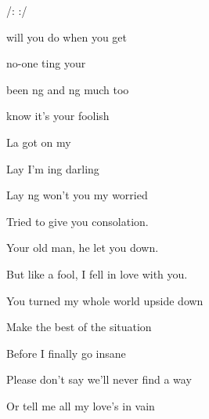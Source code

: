 

/:     :/

\zs
{} will you do when you get 

 no-one ting  your  

 been ng and ng much too 

 know it's  your foolish  
\ks

\zr
La  got  on my 

Lay I'm ing darling 

Lay ng won't you  my worried  
\kr

\zs
Tried to give you consolation.

Your old man, he let you down.

But like a fool, I fell in love with you.

You turned my whole world upside down
\ks

\zr \kr

\zs
Make the best of the situation

Before I finally go insane

Please don't say we'll never find a way

Or tell me all my love's in vain
\ks

\zr \kr

\kp






















